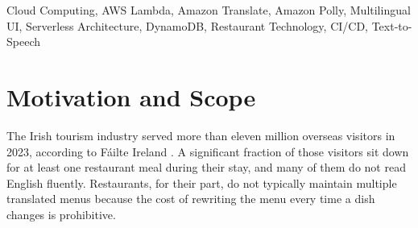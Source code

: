 \documentclass[conference]{IEEEtran}
\begin{document}
\begin{abstract}
A tourist in a Dublin trattoria picks up the menu, hesitates, and quietly asks their dining companion what ``carbonara'' means. Multiply this moment by millions each night across the hospitality industry and the case for a seamless multilingual menu experience becomes self-evident. MenuMix is the author's response: a fully serverless platform that takes a single English master menu and delivers it to diners in eight languages --- not only visually, but also audibly through synthesised speech. The system integrates six Amazon Web Services in a tightly coupled design centred on two services that no other student in the cohort adopted: \textbf{Amazon Translate} for live neural machine translation and \textbf{Amazon Polly} for voice narration using language-appropriate voices. The supporting services are AWS Lambda (Python 3.11), Amazon DynamoDB (single-table design), Amazon API Gateway (REST proxy), and Amazon S3 (dual-bucket: frontend hosting and audio storage). A reusable Python library, \texttt{menu-translator-nci}, encapsulates the domain model across three modules and ships with 57 unit tests. A fully automated GitHub Actions CI/CD pipeline provisions all AWS infrastructure from scratch, deploys both backend and frontend, and seeds a sample Italian restaurant with ten dishes --- requiring only two GitHub secrets to run against any AWS account.
\end{abstract}

\begin{IEEEkeywords}
Cloud Computing, AWS Lambda, Amazon Translate, Amazon Polly, Multilingual UI, Serverless Architecture, DynamoDB, Restaurant Technology, CI/CD, Text-to-Speech
\end{IEEEkeywords}

\section{Motivation and Scope}

The Irish tourism industry served more than eleven million overseas visitors in 2023, according to F\'ailte Ireland \cite{failte2023}. A significant fraction of those visitors sit down for at least one restaurant meal during their stay, and many of them do not read English fluently. Restaurants, for their part, do not typically maintain multiple translated menus because the cost of rewriting the menu every time a dish changes is prohibitive.
\end{document}
